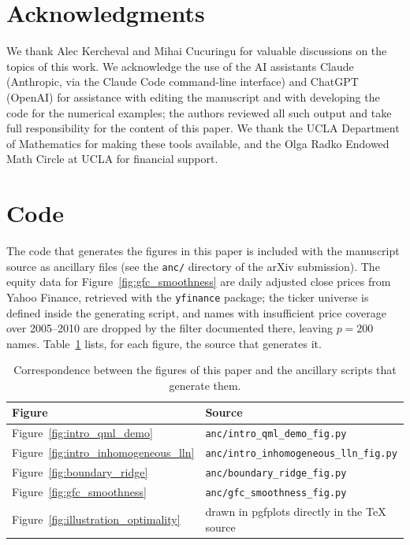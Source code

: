 \documentclass[10pt, letterpaper]{amsart}
\begin{document}
\section*{Acknowledgments}
We thank Alec Kercheval and Mihai Cucuringu for valuable discussions on the topics of this work. We acknowledge the use of the AI assistants Claude (Anthropic, via the Claude Code command-line interface) and ChatGPT (OpenAI) for assistance with editing the manuscript and with developing the code for the numerical examples; the authors reviewed all such output and take full responsibility for the content of this paper. We thank the UCLA Department of Mathematics for making these tools available, and the Olga Radko Endowed Math Circle at UCLA for financial support.

\appendix

\section{Code}\label{sec:code}

The code that generates the figures in this paper is included with the manuscript source as ancillary files (see the \texttt{anc/} directory of the arXiv submission). The equity data for Figure~\ref{fig:gfc_smoothness} are daily adjusted close prices from Yahoo Finance, retrieved with the \texttt{yfinance} package; the ticker universe is defined inside the generating script, and names with insufficient price coverage over 2005--2010 are dropped by the filter documented there, leaving $p=200$ names. Table~\ref{tab:code_figure_map} lists, for each figure, the source that generates it.

\begin{table}[h]
\centering
\begin{tabular}{l l}
\hline
Figure & Source \\
\hline
Figure~\ref{fig:intro_qml_demo} & \texttt{anc/intro\_qml\_demo\_fig.py} \\
Figure~\ref{fig:intro_inhomogeneous_lln} & \texttt{anc/intro\_inhomogeneous\_lln\_fig.py} \\
Figure~\ref{fig:boundary_ridge} & \texttt{anc/boundary\_ridge\_fig.py} \\
Figure~\ref{fig:gfc_smoothness} & \texttt{anc/gfc\_smoothness\_fig.py} \\
Figure~\ref{fig:illustration_optimality} & drawn in pgfplots directly in the \TeX{} source \\
\hline
\end{tabular}
\caption{Correspondence between the figures of this paper and the ancillary scripts that generate them.}
\label{tab:code_figure_map}
\end{table}




\end{document}
